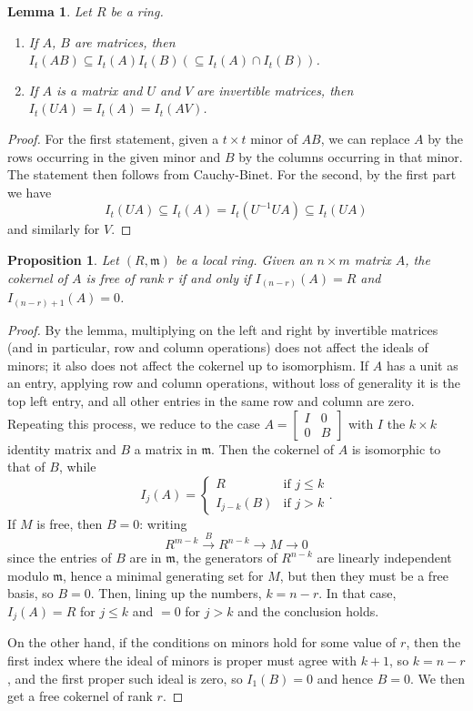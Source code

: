 \documentclass{amsart}[12pt]
\newcommand{\fm}{{\mathfrak m}}
\numberwithin{equation}{section}
\theoremstyle{plain} %
\newtheorem{lem}[equation]{Lemma}
\newtheorem{prop}[equation]{Proposition}
\theoremstyle{definition}
\theoremstyle{remark}
\newcommand{\xra}[1]{\xrightarrow{#1}}
\begin{document}
\begin{lem} Let $R$ be a ring.
\begin{enumerate}
\item If $A$, $B$ are matrices, then $I_t(AB) \subseteq I_t(A) I_t(B) (\subseteq I_t(A) \cap I_t(B))$.
\item If $A$ is a matrix and $U$ and $V$ are invertible matrices, then $I_t(UA) = I_t(A) = I_t(AV)$.
\end{enumerate}
\end{lem}
\begin{proof}
For the first statement, given a $t\times t$ minor of $AB$, we can replace $A$ by the rows occurring in the given minor and $B$ by the columns occurring in that minor. The statement then follows from Cauchy-Binet.  For the second, by the first part we have 
\[ I_t(UA) \subseteq I_t(A) = I_t(U^{-1}UA) \subseteq I_t(UA) \]
and similarly for $V$.
\end{proof}

\begin{prop}
Let $(R,\fm)$ be a local ring. Given an $n\times m$ matrix $A$, the cokernel of $A$ is free of rank $r$ if and only if $I_{(n-r)}(A)=R$ and $I_{(n-r)+1}(A)=0$.
\end{prop}
\begin{proof} By the lemma, multiplying on the left and right by invertible matrices (and in particular, row and column operations) does not affect the ideals of minors; it also does not affect the cokernel up to isomorphism. If $A$ has a unit as an entry, applying row and column operations, without loss of generality it is the top left entry, and all other entries in the same row and column are zero. Repeating this process,
we reduce to the case $A= \begin{bmatrix} I & 0 \\ 0 & B\end{bmatrix}$ with $I$ the $k\times k$ identity matrix and $B$ a matrix in $\fm$. 
Then the cokernel of $A$ is isomorphic to that of $B$, while \[ I_{j}(A)=\begin{cases} R & \text{if } j\leq k \\ I_{j-k}(B) & \text{if } j > k\end{cases}.\]
If $M$ is free, then $B=0$: writing
\[ R^{m-k} \xra{B} R^{n-k} \to M \to 0\]
since the entries of $B$ are in $\fm$, the generators of $R^{n-k}$ are linearly independent modulo $\fm$, hence a minimal generating set for $M$, but then they must be a free basis, so $B=0$.
Then, lining up the numbers, $k=n-r$. In that case, $I_{j}(A) = R$ for $j\leq k$ and $=0$ for $j>k$ and the conclusion holds. 

On the other hand, if the conditions on minors hold for some value of $r$, then the first index where the ideal of minors is proper must agree with $k+1$, so $k=n-r$, and the first proper such ideal is zero, so $I_1(B)=0$ and hence $B=0$. We then get a free cokernel of rank $r$.
\end{proof}
\end{document}
